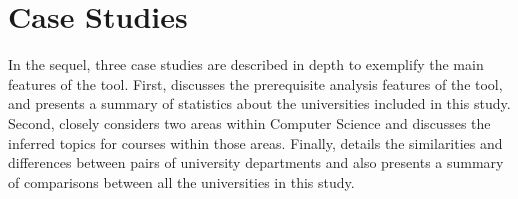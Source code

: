 \section{Case Studies}
\label{sec:case-studies}


In the sequel, three case studies are described in depth to exemplify the main features of the tool.
First,  discusses the prerequisite analysis features of the tool, and presents a summary of statistics about the universities included in this study.
Second,  closely considers two areas within Computer Science and discusses the inferred topics for courses within those areas.
Finally,  details the similarities and differences between pairs of university departments and also presents a summary of comparisons between all the universities in this study.





